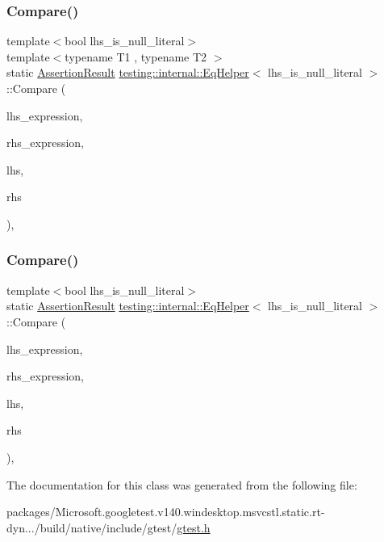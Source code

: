 \subsubsection{\texorpdfstring{Compare()}{Compare()}\hspace{0.1cm}{\footnotesize\ttfamily [1/2]}}
{\footnotesize\ttfamily template$<$bool lhs\+\_\+is\+\_\+null\+\_\+literal$>$ \\
template$<$typename T1 , typename T2 $>$ \\
static \mbox{\hyperlink{classtesting_1_1_assertion_result}{Assertion\+Result}} \mbox{\hyperlink{classtesting_1_1internal_1_1_eq_helper}{testing\+::internal\+::\+Eq\+Helper}}$<$ lhs\+\_\+is\+\_\+null\+\_\+literal $>$\+::Compare (\begin{DoxyParamCaption}\item[{const char $\ast$}]{lhs\+\_\+expression,  }\item[{const char $\ast$}]{rhs\+\_\+expression,  }\item[{const T1 \&}]{lhs,  }\item[{const T2 \&}]{rhs }\end{DoxyParamCaption})\hspace{0.3cm}{\ttfamily [inline]}, {\ttfamily [static]}}

\mbox{\label{classtesting_1_1internal_1_1_eq_helper_aaa42c0059bb3dcc43d556243febb5f1c}} 
\subsubsection{\texorpdfstring{Compare()}{Compare()}\hspace{0.1cm}{\footnotesize\ttfamily [2/2]}}
{\footnotesize\ttfamily template$<$bool lhs\+\_\+is\+\_\+null\+\_\+literal$>$ \\
static \mbox{\hyperlink{classtesting_1_1_assertion_result}{Assertion\+Result}} \mbox{\hyperlink{classtesting_1_1internal_1_1_eq_helper}{testing\+::internal\+::\+Eq\+Helper}}$<$ lhs\+\_\+is\+\_\+null\+\_\+literal $>$\+::Compare (\begin{DoxyParamCaption}\item[{const char $\ast$}]{lhs\+\_\+expression,  }\item[{const char $\ast$}]{rhs\+\_\+expression,  }\item[{\mbox{\hyperlink{namespacetesting_1_1internal_a05c6bd9ede5ccdf25191a590d610dcc6}{Biggest\+Int}}}]{lhs,  }\item[{\mbox{\hyperlink{namespacetesting_1_1internal_a05c6bd9ede5ccdf25191a590d610dcc6}{Biggest\+Int}}}]{rhs }\end{DoxyParamCaption})\hspace{0.3cm}{\ttfamily [inline]}, {\ttfamily [static]}}



The documentation for this class was generated from the following file\+:\begin{DoxyCompactItemize}
\item 
packages/\+Microsoft.\+googletest.\+v140.\+windesktop.\+msvcstl.\+static.\+rt-\/dyn.../build/native/include/gtest/\mbox{\hyperlink{gtest_8h}{gtest.\+h}}\end{DoxyCompactItemize}
